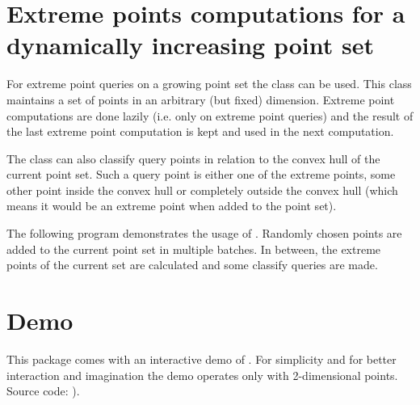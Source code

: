 

\section{Extreme points computations for a dynamically increasing point set}
For extreme point queries on a growing point set the class  can be used. This class maintains a set of points in an arbitrary (but fixed) dimension. Extreme point computations are done lazily (i.e. only on extreme point queries) and the result of the last extreme point computation is kept and used in the next computation.

The class can also classify query points in relation to the convex hull of the current point set. Such a query point is either one of the extreme points, some other point inside the convex hull or completely outside the convex hull (which means it would be an extreme point when added to the point set).

\ccExample
The following program demonstrates the usage of . Randomly chosen points are added to the current point set in multiple batches. In between, the extreme points of the current set are calculated and some classify queries are made.



\section{Demo}

This package comes with an interactive demo of . For simplicity and for better interaction and imagination the demo operates only with 2-dimensional points. Source code: ).

